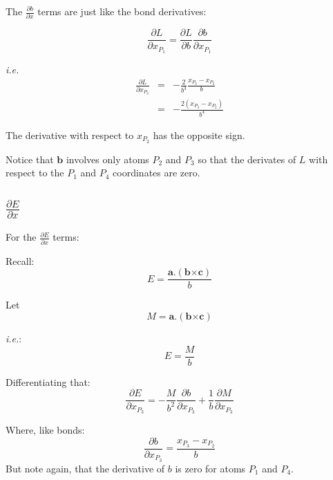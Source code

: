 The $\frac{\partial b}{\partial x}$ terms are just like the bond
derivatives:

\begin{displaymath}
  \frac{\partial L}{\partial x_{P_1}} = \frac{\partial L}{\partial b} \frac{\partial b}{\partial x_{P_1}}
\end{displaymath}

\emph{i.e. }
\begin{eqnarray*}
  \frac{\partial L}{\partial x_{P_3}} & = &-\frac{2}{b^3} \frac{x_{P_3}-x_{P_2}}{b}\\
  & = &-\frac{2(x_{P_3}-x_{P_2})}{b^4}
\end{eqnarray*}

The derivative with respect to $x_{P_2}$ has the opposite sign.

Notice that $\mathbf{b}$ involves only atoms $P_2$ and $P_3$ so that
the derivates of $L$ with respect to the $P_1$ and $P_4$ coordinates are zero.

\subsection{$\frac{\partial E}{\partial x}$}
For the $\frac{\partial E}{\partial x}$ terms: 

Recall:
\begin{displaymath}
  E = \frac{\mathbf{a}.(\mathbf{b} \mathbf{\times}\mathbf{c})}{b}
\end{displaymath}

Let
\begin{displaymath}
  M = \mathbf{a}.(\mathbf{b} \mathbf{\times}\mathbf{c})
\end{displaymath}

\emph{i.e.}:
\begin{displaymath}
  E = \frac{M}{b}
\end{displaymath}

Differentiating that:
\begin{displaymath}
  \frac{\partial E}{\partial x_{P_3}} = -\frac{M}{b^2} \frac{\partial b}{\partial x_{P_3}} 
  +  \frac{1}{b} \frac{\partial M}{\partial x_{P_3}}
\end{displaymath}

Where, like bonds:
\begin{displaymath}
  \frac{\partial b}{\partial x_{P_3}} = \frac{x_{P_3}-x_{P_2}}{b}
\end{displaymath}
But note again, that the derivative of $b$ is zero for atoms $P_1$ and $P_4$.



